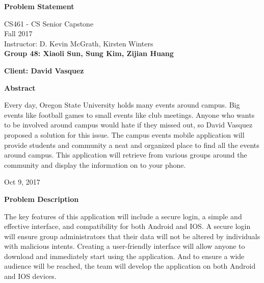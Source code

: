 \documentclass[10pt,letterpaper]{article}
\begin{document}
\begin{titlepage}
\begin{center}
    \Huge
    \textbf{Problem Statement}
    
    \vspace{0.5in}
    \large
    CS461 - CS Senior Capstone\\
    
    \vspace{0.2in}
    \large
    Fall 2017\\
    
    \vspace{0.2in}
    \large
    Instructor: D. Kevin McGrath, Kirsten Winters\\
    
    \vspace{0.2in}
    \textbf{Group 48: Xiaoli Sun, Sung Kim, Zijian Huang}
    
    \vspace{0.2in}
    \textbf{Client: David Vasquez}
    
    \vspace{0.5in}
    \textbf{Abstract}\\
    \vspace{0.2in}
    
    Every day, Oregon State University holds many events around campus. Big events like football games to small events like club meetings. Anyone who wants to be involved around campus would hate if they missed out, so David Vasquez proposed a solution for this issue. The campus events mobile application will provide students and community a neat and organized place to find all the events around campus. This application will retrieve from various groups around the community and display the information on to your phone. 
    \vspace{0.3in}
    \vfill
    
    Oct 9, 2017

\end{center}
\end{titlepage}

\newpage

\begin{center}
\large
\textbf{Problem Description}
\end{center}

The key features of this application will include a secure login, a simple and effective interface, and compatibility for both Android and IOS. A secure login will ensure group administrators that their data will not be altered by individuals with malicious intents. Creating a user-friendly interface will allow anyone to download and immediately start using the application. And to ensure a wide audience will be reached, the team will develop the application on both Android and IOS devices. \\
\end{document}
